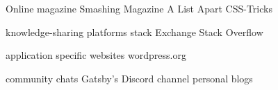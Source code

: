 Online magazine 
  Smashing Magazine 
  A List Apart
  CSS-Tricks

knowledge-sharing platforms
  stack Exchange 
  Stack Overflow

application specific websites
  wordpress.org

community chats 
  Gatsby's Discord channel
  personal blogs

